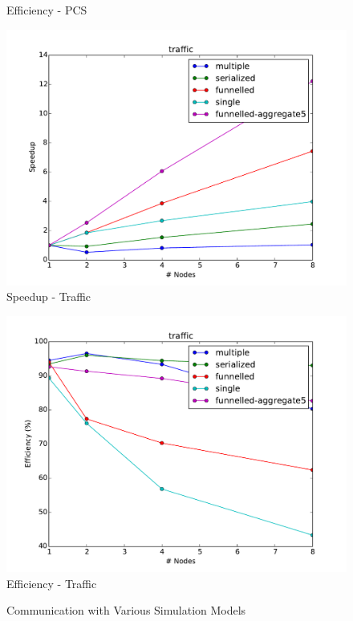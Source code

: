 \documentclass[11pt]{book}
\begin{document}
\begin{figure}
\begin{minipage}{.5\textwidth}
\begin{center}
      Efficiency - PCS \\
    \end{center}
  \end{minipage}
  \begin{minipage}{.5\textwidth}
    \begin{center}
      \includegraphics[width=\textwidth,keepaspectratio,quiet]{figs/partitioning_communication/communication_traffic_speedup.pdf} \\
      Speedup - Traffic \\
    \end{center}
  \end{minipage}%
  \hfill
  \begin{minipage}{.5\textwidth}
    \begin{center}
      \includegraphics[width=\textwidth,keepaspectratio,quiet]{figs/partitioning_communication/communication_traffic_efficiency.pdf} \\
      Efficiency - Traffic \\
    \end{center}
  \end{minipage}
  \caption{Communication with Various Simulation Models}\label{model_communication}
\end{figure}
\end{document}
